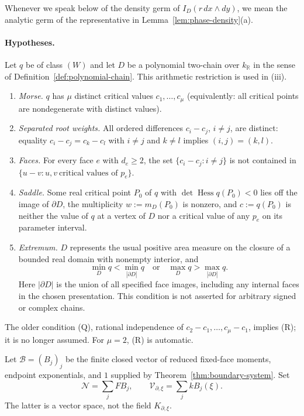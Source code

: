 \documentclass[11pt]{article}
\numberwithin{equation}{section}
\theoremstyle{definition}
\theoremstyle{remark}
\newcommand{\R}{\mathbb R}
\newcommand{\Vcal}{\mathcal V}
\newcommand{\Ncal}{\mathcal N}
\newcommand{\Bcal}{\mathcal B}
\begin{document}
Whenever we speak below of the density germ of
$I_D(r\,dx\wedge dy)$, we mean the analytic germ of the representative
in Lemma~\ref{lem:phase-density}(a).

\paragraph{Hypotheses.} Let $q$ be of class $(W)$ and let $D$ be a
polynomial two-chain over $k_\R$ in the sense of
Definition~\ref{def:polynomial-chain}.  This arithmetic restriction is
used in (iii).
\begin{enumerate}[label=\textup{(\Alph*)},leftmargin=2.6em]
\item[(M)] \emph{Morse.} $q$ has $\mu$ distinct critical values
 $c_1,\dots,c_\mu$ (equivalently: all critical points are nondegenerate with
 distinct values).
\item[(R)] \emph{Separated root weights.} All ordered differences
 $c_i-c_j$, $i\ne j$, are distinct: equality $c_i-c_j=c_k-c_l$ with
 $i\ne j$ and $k\ne l$ implies $(i,j)=(k,l)$.
\item[(F)] \emph{Faces.} For every face $e$ with $d_e\ge2$, the set
 $\{c_i-c_j:i\ne j\}$ is not contained in
 $\{u-v: u,v\ \text{critical values of }p_e\}$.
\item[(S)] \emph{Saddle.} Some real critical point $P_0$ of $q$ with
 $\det\operatorname{Hess}q(P_0)<0$ lies off the image of $\partial D$, the
 multiplicity $w:=m_D(P_0)$ is nonzero, and $c:=q(P_0)$ is neither the
 value of $q$ at a vertex of $D$ nor a critical value of any $p_e$ on its
 parameter interval.
\item[(E)] \emph{Extremum.} $D$ represents the usual positive area measure
 on the closure of a bounded real domain with nonempty interior, and
 \[
 \min_D q<\min_{|\partial D|}q
 \quad\text{or}\quad
 \max_D q>\max_{|\partial D|}q.
 \]
 Here $|\partial D|$ is the union of all specified face images, including
 any internal faces in the chosen presentation. This condition is not
 asserted for arbitrary signed or complex chains.
\end{enumerate}
The older condition (Q), rational independence of
$c_2-c_1,\ldots,c_\mu-c_1$, implies (R); it is no longer assumed.
For $\mu=2$, (R) is automatic.

Let $\Bcal=(B_j)_j$ be the finite closed vector of reduced fixed-face moments,
endpoint exponentials, and $1$ supplied by
Theorem~\ref{thm:boundary-system}. Set
\[
 \Ncal=\sum_j F B_j,\qquad
 \Vcal_{\partial,\xi}=\sum_j k B_j(\xi).
\]
The latter is a vector space, not the field $K_{\partial,\xi}$.
\end{document}

